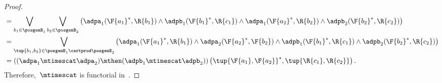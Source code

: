 \begin{proof}
\begin{equation}
\begin{aligned}
            &=\bigvee_{b_1\in \posgenB_1}\bigvee_{b_2\in \posgenB_2} \left(\adpa_1(\F{a_1}^*,\R{b_1})\wedge \adpb_1(\F{b_1}^*,\R{c_1})\wedge \adpa_1(\F{a_2}^*,\R{b_2})\wedge \adpb_2(\F{b_2}^*,\R{c_2}) \right)\\
            &=\bigvee_{\tup{b_1,b_2}\in \posgenB_1\cartprod \posgenB_2} \left(\adpa_1(\F{a_1}^*,\R{b_1})\wedge \adpa_2(\F{a_2}^*,\F{b_2})\wedge \adpb_1(\F{b_1}^*,\R{c_1})\wedge \adpb_2(\F{b_2}^*,\R{c_2}) \right)\\
            &=\left( (\adpa_1\mtimescat \adpa_2)\mthen (\adpb_1\mtimescat \adpb_2)\right)\left(\tup{\F{a_1},\F{a_2}}^*,\tup{\R{c_1},\R{c_2}} \right).
        \end{aligned}
    \end{equation}
    Therefore,~$\mtimescat$ is functorial in~\DP.
\end{proof}


